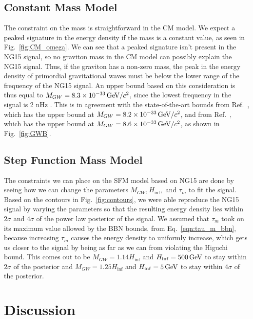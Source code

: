 \documentclass[prd,twocolumn,aps,psfig,nofootinbib,nobibnotes,superscriptaddress,preprintnumbers,times]{revtex4-2}
\newcommand{\GeV}{\,{\rm GeV}}
\begin{document}
\subsection{Constant Mass Model}

The constraint on the mass is straightforward in the CM model. We expect a peaked signature in the energy density if the mass is a constant value, as seen in Fig.\ \ref{fig:CM_omega}. We can see that a peaked signature isn't present in the NG15 signal, so no graviton mass in the CM model can possibly explain the NG15 signal. Thus, if the graviton has a non-zero mass, the peak in the energy density of primordial gravitational waves must be below the lower range of the frequency of the NG15 signal. An upper bound based on this consideration is thus equal to $M_{GW} = 8.3\times10^{-33} \GeV/c^2$, since the lowest frequency in the signal is 2 nHz \cite{Agazie:2023}. This is in agreement with the state-of-the-art bounds from Ref.\ \cite{Wu:2023}, which has the upper bound at $M_{GW} = 8.2\times10^{-33} \GeV/c^2$, and from Ref.\ \cite{Wang:2023}, which has the upper bound at $M_{GW} = 8.6\times10^{-33} \GeV/c^2$, as shown in Fig.\ \ref{fig:GWB}.

\subsection{Step Function Mass Model}

The constraints we can place on the SFM model based on NG15 are done by seeing how we can change the parameters $M_{GW}, H_{\inf},$ and $\tau_m$ to fit the signal. Based on the contours in Fig.\ \ref{fig:contours}, we were able reproduce the NG15 signal by varying the parameters so that the resulting energy density lies within $2\sigma$ and $4\sigma$ of the power law posterior of the signal. We assumed that $\tau_m$ took on its maximum value allowed by the BBN bounds, from Eq.\ \ref{eqn:tau_m_bbn}, because increasing $\tau_m$ causes the energy density to uniformly increase, which gets us closer to the signal by being as far as we can from violating the Higuchi bound. This comes out to be $M_{GW} = 1.14H_{\inf}$ and $H_{\inf} = 500 \GeV$ to stay within $2\sigma$ of the posterior and $M_{GW} = 1.25H_{\inf}$ and $H_{\inf} = 5 \GeV$ to stay within $4\sigma$ of the posterior. 


\section{Discussion}\label{sec:discussion}
\end{document}
